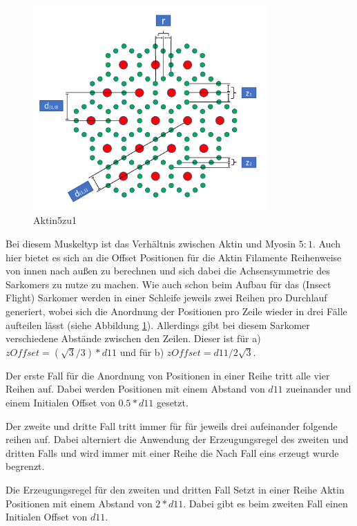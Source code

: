 \documentclass[a4paper,m]{cgBA}
\begin{document}
\begin{figure}[h]
\center
\includegraphics[width=0.8\textwidth]{Graphics/Actin5zu1Abstaende.pdf}
\caption{Aktin5zu1}
\label{fig:Aktin5zu1}
\end{figure}

Bei diesem Muskeltyp ist das Verhältnis zwischen Aktin und Myosin \(5:1\). Auch hier bietet es sich an die Offset Positionen für die Aktin Filamente Reihenweise von innen nach außen zu berechnen und sich dabei die Achsensymmetrie des Sarkomers zu nutze zu machen. Wie auch schon beim Aufbau für das (Insect Flight) Sarkomer werden in einer Schleife jeweils zwei Reihen pro Durchlauf generiert, wobei sich die Anordnung der Positionen pro Zeile wieder in drei Fälle aufteilen lässt (siehe Abbildung \ref{fig:Aktin5zu1}). Allerdings gibt bei diesem Sarkomer verschiedene Abstände zwischen den Zeilen. Dieser ist für a) \(zOffset =(\sqrt{3} / 3) * d11\) und für b) \(zOffset = d11 / 2\sqrt{3}\).

Der erste Fall für die Anordnung von Positionen in einer Reihe tritt alle vier Reihen auf. Dabei werden Positionen mit einem Abstand von \(d11\) zueinander und einem Initialen Offset von \(0.5 * d11\) gesetzt.

Der zweite und dritte Fall tritt immer für für jeweils drei aufeinander folgende reihen auf. Dabei alterniert die Anwendung der Erzeugungsregel des zweiten und dritten Falls und wird immer mit einer Reihe die Nach Fall eins erzeugt wurde begrenzt. 

Die Erzeugungsregel für den zweiten und dritten Fall Setzt in einer Reihe Aktin Positionen mit einem Abstand von \(2 * d11\).
Dabei gibt es beim zweiten Fall einen Initialen Offset von \(d11\).
\end{document}

